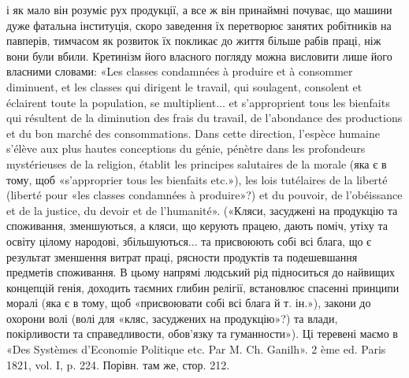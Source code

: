 і як мало він розуміє рух продукції, а все ж він принаймні почуває,
що машини дуже фатальна інституція, скоро заведення їх перетворює
занятих робітників на павперів, тимчасом як розвиток їх покликає до
життя більше рабів праці, ніж вони були вбили. Кретинізм його власного
погляду можна висловити лише його власними словами: «Les classes
condamnées à produire et à consommer diminuent, et les classes qui dirigent
le travail, qui soulagent, consolent et éclairent toute la population,
se multiplient... et s’approprient tous les bienfaits qui résultent de la diminution
des frais du travail, de l’abondance des productions et du bon marché
des consommations. Dans cette direction, l’espèce humaine s’élève aux plus
hautes conceptions du génie, pénètre dans les profondeurs mystérieuses de la
religion, établit les principes salutaires de la morale (яка є в тому, щоб «s’approprier
tous les bienfaits etc.»), les lois tutélaires de la liberté (liberté pour
«les classes condamnées à produire»?) et du pouvoir, de l’obéissance et de
la justice, du devoir et de l’humanité». («Кляси, засуджені на продукцію
та споживання, зменшуються, а кляси, що керують працею, дають поміч,
утіху та освіту цілому народові, збільшуються... та присвоюють собі
всі блага, що є результат зменшення витрат праці, рясности продуктів
та подешевшання предметів споживання. В цьому напрямі людський
рід підноситься до найвищих концепцій генія, доходить таємних глибин
релігії, встановлює спасенні принципи моралі (яка є в тому, щоб «присвоювати
собі всі блага й т. ін.»), закони до охорони волі (волі для «кляс,
засуджених на продукцію»?) та влади, покірливости та справедливости,
обов’язку та гуманности»). Ці теревені маємо в «Des Systèmes d’Economie
Politique etc. Par M. Ch. Ganilh». 2 ème ed. Paris 1821, vol. I, p. 224.
Порівн. там же, стор. 212.
\parbreak{}  %
